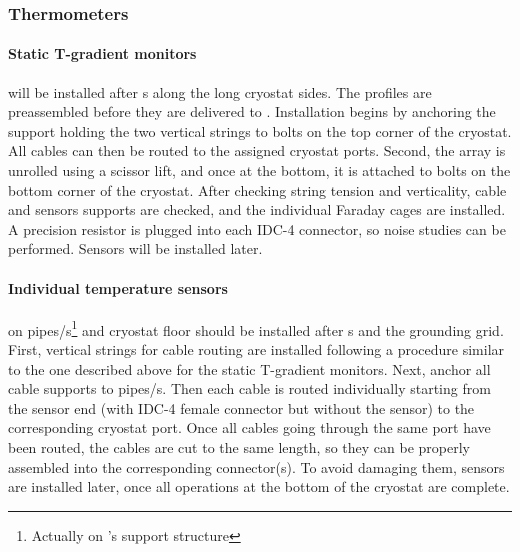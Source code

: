 \subsubsection{Thermometers}
\label{sec:fdgen-slow-cryo-install-th}

\paragraph{Static T-gradient monitors}
will be installed after s along the long cryostat sides. The profiles %
are preassembled before they are delivered to \surf. 
Installation begins by anchoring the support holding the two vertical strings to bolts on the top corner of the cryostat. All cables can then be routed to the assigned cryostat ports. Second, the array is unrolled using a scissor lift, and once at the bottom, it is attached to bolts on the bottom corner of the cryostat. After checking string tension and verticality, cable and sensors supports are checked, and the individual Faraday cages are installed. A precision resistor is plugged into each IDC-4 connector, so noise studies can be performed. Sensors will be installed later. 

\paragraph{Individual temperature sensors} on pipes/s\footnote{Actually on 's support structure}  and cryostat floor %
should be installed after s and the grounding grid. First, vertical strings for cable routing %
are installed following a procedure similar to the one described above for the static T-gradient monitors. Next, anchor all cable supports to pipes/s. Then each cable %
is routed individually starting from the sensor end (with IDC-4 female connector but without the sensor)
to the corresponding cryostat port. Once all cables going through the same port have been routed, the cables are cut to the same length, so they can be properly assembled into the corresponding connector(s). To avoid damaging them, sensors are installed later, once all operations at the bottom of the cryostat are complete. 

 


